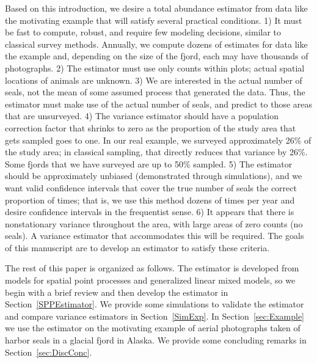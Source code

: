 \documentclass[12pt, titlepage]{article}\usepackage[]{graphicx}\usepackage[]{color}
\begin{document}
Based on this introduction, we desire a total abundance estimator from data like the motivating example that will satisfy several practical conditions. 1) It must be fast to compute, robust, and require few modeling decisions, similar to classical survey methods. Annually, we compute dozens of estimates for data like the example and, depending on the size of the fjord, each may have thousands of photographs. 2) The estimator must use only counts within plots; actual spatial locations of animals are unknown. 3) We are interested in the actual number of seals, not the mean of some assumed process that generated the data. Thus, the estimator must make use of the actual number of seals, and predict to those areas that are unsurveyed. 4) The variance estimator should have a population correction factor that shrinks to zero as the proportion of the study area that gets sampled goes to one.  In our real example, we surveyed approximately 26\% of the study area; in classical sampling, that directly reduces that variance by 26\%. Some fjords that we have surveyed are up to 50\% sampled. 5) The estimator should be approximately unbiased (demonstrated through simulations), and we want valid confidence intervals that cover the true number of seals the correct proportion of times; that is, we use this method dozens of times per year and desire confidence intervals in the frequentist sense. 6) It appears that there is nonstationary variance throughout the area, with large areas of zero counts (no seals).  A variance estimator that accommodates this will be required.  The goals of this manuscript are to develop an estimator to satisfy these criteria.

The rest of this paper is organized as follows.  The estimator is developed from models for spatial point processes and generalized linear mixed models, so we begin with a brief review and then develop the estimator in Section~\ref{SPPEstimator}.  We provide some simulations to validate the estimator and compare variance estimators in Section~\ref{SimExp}. In Section~\ref{sec:Example} we use the estimator on the motivating example of aerial photographs taken of harbor seals in a glacial fjord in Alaska.  We provide some concluding remarks in Section~\ref{sec:DiscConc}.              


\end{document}
